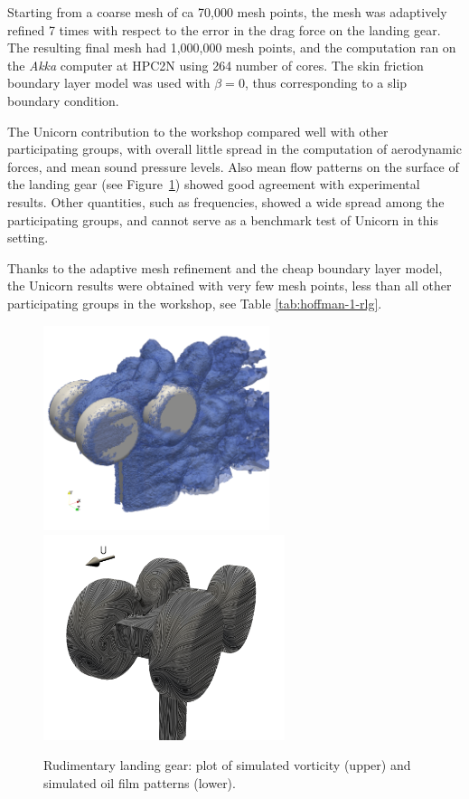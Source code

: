 Starting from a coarse mesh of ca 70,000 mesh points, the mesh was
adaptively refined 7 times with respect to the error in the drag force
on the landing gear. The resulting final mesh had 1,000,000 mesh points,
and the computation ran on the \textit{Akka} computer at HPC2N using
264 number of cores. The skin friction boundary layer model was used
with $\beta=0$, thus corresponding to a slip boundary condition.

The Unicorn contribution to the workshop compared well with other
participating groups, with overall little spread in the computation
of aerodynamic forces, and mean sound pressure levels. Also mean flow
patterns on the surface of the landing gear (see Figure~\ref{rlg})
showed good agreement with experimental results. Other quantities, such
as frequencies, showed a wide spread among the participating groups,
and cannot serve as a benchmark test of Unicorn in this setting.

Thanks to the adaptive mesh refinement and the cheap boundary layer
model, the Unicorn results were obtained with very few mesh points,
less than all other participating groups in the workshop, see Table
\ref{tab:hoffman-1-rlg}.

\begin{figure}
\centering
\includegraphics[height=6cm]{chapters/hoffman-1/png/rlg_vorticity}
\includegraphics[height=6cm]{chapters/hoffman-1/png/oilfilm_back_sim}
\caption{Rudimentary landing gear: plot of simulated vorticity (upper)
and simulated oil film patterns (lower).}
\label{rlg}
\end{figure}

